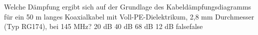    {Welche Dämpfung ergibt sich auf der Grundlage des Kabeldämpfungsdiagramms für ein 50 m langes Koaxialkabel mit Voll-PE-Dielektrikum, 2,8 mm Durchmesser (Typ RG174), bei 145 MHz?}
    {20 dB}
    {40 dB}
    {68 dB}
    {12 dB}
    {false}{false}